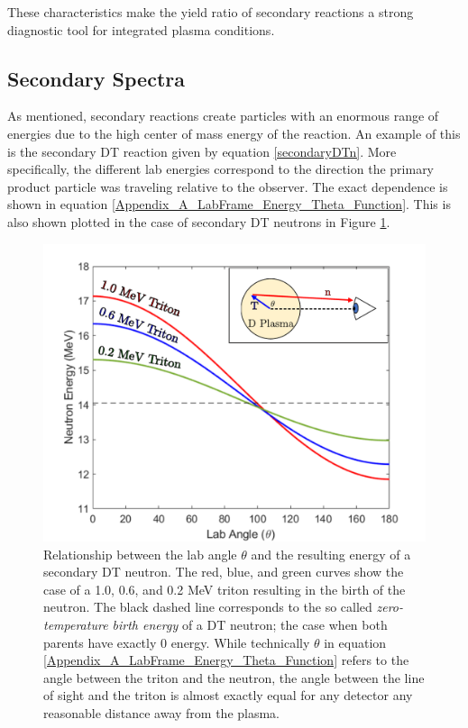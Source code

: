 	These characteristics make the yield ratio of secondary reactions a strong diagnostic tool for integrated plasma conditions. 
	
	
\subsection{Secondary Spectra}

	As mentioned, secondary reactions create particles with an enormous range of energies due to the high center of mass energy of the reaction. An example of this is the secondary DT reaction given by equation \ref{secondaryDTn}. More specifically, the different lab energies correspond to the direction the primary product particle was traveling relative to the observer. The exact dependence is shown in equation \ref{Appendix_A_LabFrame_Energy_Theta_Function}. This is also shown plotted in the case of secondary DT neutrons in Figure \ref{secondaryDTnEnergy}.
	
	
	\begin{figure}[h!]
		\centering
		\includegraphics[scale=0.6]{Figures/secondaryDTnEnergy.pdf}
		\caption[Secondary DT neutron angle-energy relationship]{Relationship between the lab angle $\theta$ and the resulting energy of a secondary DT neutron. The red, blue, and green curves show the case of a 1.0, 0.6, and 0.2 MeV triton resulting in the birth of the neutron. The black dashed line corresponds to the so called \emph{zero-temperature birth energy} of a DT neutron; the case when both parents have exactly 0 energy. While technically $\theta$ in equation \ref{Appendix_A_LabFrame_Energy_Theta_Function} refers to the angle between the triton and the neutron, the angle between the line of sight and the triton is almost exactly equal for any detector any reasonable distance away from the plasma. }
		\label{secondaryDTnEnergy}
	\end{figure}

